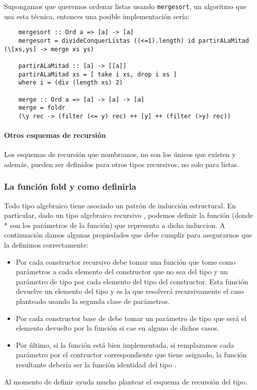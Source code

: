 Supongamos que queremos ordenar listas usando \texttt{mergesort}, un algoritmo que usa esta técnica, entonces una posible implementación sería:

\begin{centrado}
	\begin{verbatim}
	mergesort :: Ord a => [a] -> [a]
	mergesort = divideConquerListas ((<=1).length) id partirALaMitad (\[xs,ys] -> merge xs ys)	

	partirALaMitad :: [a] -> [[a]]
	partirALaMitad xs = [ take i xs, drop i xs ] 
	where i = (div (length xs) 2)
	
	merge :: Ord a => [a] -> [a] -> [a]
	merge = foldr 
	(\y rec -> (filter (<= y) rec) ++ [y] ++ (filter (>y) rec))	 
	\end{verbatim}
\end{centrado}


\paragraph{Otros esquemas de recursión} Los esquemas de recursión que nombramos, no son los únicos que existen y además, pueden ser definidos para otros tipos recursivos, no solo para listas.

\subsubsection{La función fold y como definirla}
Todo tipo algebraico tiene asociado un patrón de inducción estructural. En particular, dado un tipo algebraico recursivo , podemos definir la función  (donde * son los parámetros de la función) que representa a dicha induccion. A continuación damos algunas propiedades que debe cumplir  para asegurarnos que la definimos correctamente:
\begin{itemize}
	\item Por cada constructor recursivo debe tomar una función que tome como parámetros a cada elemento del constructor que no sea del tipo  y un parámetro de tipo  por cada elemento del tipo   del constructor. Esta función devuelve un elemento del tipo  y es la que resolverá recursivamente el caso planteado usando la segunda clase de parámetros.
	\item Por cada constructor base de  debe tomar un parámetro de tipo  que será el elemento devuelto por la función si cae en alguno de dichos casos.
	\item Por último, si la función está bien implementada, si remplazamos cada parámetro por el contructor correspondiente que tiene asignado, la función resultante debería ser la función identidad del tipo .
\end{itemize}


Al momento de definir  ayuda mucho plantear el esquema de recursión del tipo.